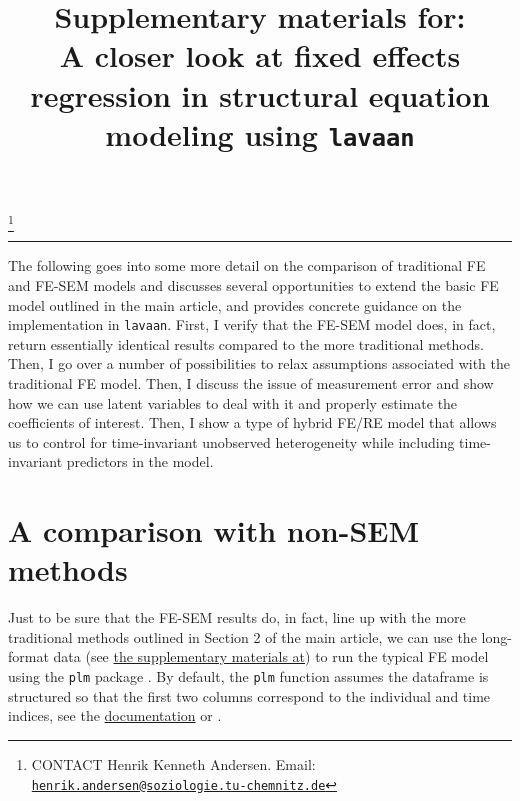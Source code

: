 \documentclass[]{interact}
\theoremstyle{plain}%
\theoremstyle{definition}
\theoremstyle{remark}
\begin{document}
\articletype{}

\title{Supplementary materials for:\\
A closer look at fixed effects regression in structural equation
modeling using \texttt{lavaan}}


\author{
}

\thanks{CONTACT Henrik Kenneth Andersen. Email: \href{mailto:henrik.andersen@soziologie.tu-chemnitz.de}{\nolinkurl{henrik.andersen@soziologie.tu-chemnitz.de}}}

\maketitle



\singlespacing

\doublespacing

\begin{center}\rule{0.5\linewidth}{0.5pt}\end{center}

The following goes into some more detail on the comparison of
traditional FE and FE-SEM models and discusses several opportunities to
extend the basic FE model outlined in the main article, and provides
concrete guidance on the implementation in \texttt{lavaan}. First, I
verify that the FE-SEM model does, in fact, return essentially identical
results compared to the more traditional methods. Then, I go over a
number of possibilities to relax assumptions associated with the
traditional FE model. Then, I discuss the issue of measurement error and
show how we can use latent variables to deal with it and properly
estimate the coefficients of interest. Then, I show a type of hybrid
FE/RE model that allows us to control for time-invariant unobserved
heterogeneity while including time-invariant predictors in the model.

\hypertarget{a-comparison-with-non-sem-methods}{%
\section{A comparison with non-SEM
methods}\label{a-comparison-with-non-sem-methods}}

Just to be sure that the FE-SEM results do, in fact, line up with the
more traditional methods outlined in Section 2 of the main article, we
can use the long-format data (see
\href{https://github.com/henrik-andersen/FE-SEM}{the supplementary
materials at}) to run the typical FE model using the \texttt{plm}
package \citep{R-plm_a}. By default, the \texttt{plm} function assumes
the dataframe is structured so that the first two columns correspond to
the individual and time indices, see the
\href{https://cran.r-project.org/web/packages/plm/plm.pdf}{documentation}
or \citet{R-plm_a}.
\end{document}
